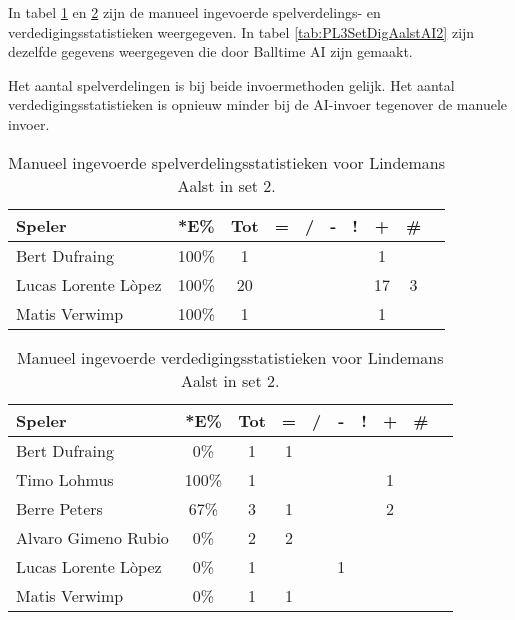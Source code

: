 In tabel \ref{tab:PL3SetAalstMan2} en \ref{tab:PL3DigAalstMan2} zijn de manueel ingevoerde spelverdelings- en verdedigingsstatistieken weergegeven. In tabel \ref{tab:PL3SetDigAalstAI2} zijn dezelfde gegevens weergegeven die door Balltime AI zijn gemaakt.

Het aantal spelverdelingen is bij beide invoermethoden gelijk. Het aantal verdedigingsstatistieken is opnieuw minder bij de AI-invoer tegenover de manuele invoer.

\begin{table}[ht!]
    \centering
    \scriptsize
    \begin{tabular}{|l|c|c|c|c|c|c|c|c|c|}
        \hline
        \textbf{Speler} & *E\% & Tot & = & / & - & ! & + & \# \\ \hline
        Bert Dufraing & 100\% & 1 &  &  & &  & 1 & \\ 
        Lucas Lorente Lòpez & 100\% & 20 &  &  & & & 17 & 3 \\ 
        Matis Verwimp & 100\% & 1 & & & & & 1 & \\ \hline
    \end{tabular}
    \caption[Manueel ingevoerde spelverdelingsstatistieken voor Lindemans Aalst in set 2]{\label{tab:PL3SetAalstMan2}Manueel ingevoerde spelverdelingsstatistieken voor Lindemans Aalst in set 2.}
\end{table}

\begin{table}[ht!]
    \centering
    \scriptsize
    \begin{tabular}{|l|c|c|c|c|c|c|c|c|c|}
        \hline
        \textbf{Speler} & *E\% & Tot & = & / & - & ! & + & \# \\ \hline
        Bert Dufraing & 0\% & 1 & 1 &  &  &  &  & \\ 
        Timo Lohmus & 100\% & 1 &  &  &  &  & 1 & \\ 
        Berre Peters & 67\% & 3 & 1 &  &  &  & 2 & \\ 
        Alvaro Gimeno Rubio & 0\% & 2 & 2 &  &  &  &  & \\ 
        Lucas Lorente Lòpez & 0\% & 1 &  &  & 1 &  &  & \\ 
        Matis Verwimp & 0\% & 1 & 1 & & & & & \\\hline
    \end{tabular}
    \caption[Manueel ingevoerde verdedigingsstatistieken voor Lindemans Aalst in set 2]{\label{tab:PL3DigAalstMan2}Manueel ingevoerde verdedigingsstatistieken voor Lindemans Aalst in set 2.}
\end{table}

